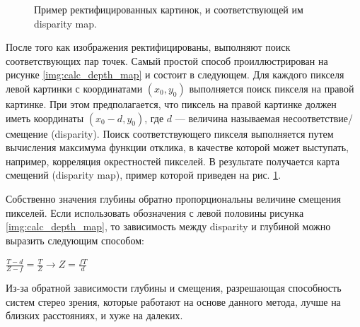 \begin{figure}[H]
\begin{minipage}[h]{0.3\linewidth}
	\end{minipage}
	\caption{Пример ректифицированных картинок, и соответствующей им disparity map.}
	\label{depth_example1}
\end{figure}

После того как изображения ректифицированы, выполняют поиск соответствующих пар точек. Самый простой способ проиллюстрирован на рисунке \ref{img:calc_depth_map} и состоит в следующем. Для каждого пикселя левой картинки с координатами $(x_0, y_0)$ выполняется поиск пикселя на правой картинке. При этом предполагается, что пиксель на правой картинке должен иметь координаты $(x_0 - d, y_0)$, где $d$ — величина называемая несоответствие/смещение (disparity). Поиск соответствующего пикселя выполняется путем вычисления максимума функции отклика, в качестве которой может выступать, например, корреляция окрестностей пикселей. В результате получается карта смещений (disparity map), пример которой приведен на рис. \ref{depth_example1}.


Собственно значения глубины обратно пропорциональны величине смещения пикселей. Если использовать обозначения с левой половины рисунка \ref{img:calc_depth_map}, то зависимость между disparity и глубиной можно выразить следующим способом:

$\displaystyle \frac{T-d}{Z-f}=\frac{T}{Z} \rightarrow Z=\frac{fT}{d}$

Из-за обратной зависимости глубины и смещения, разрешающая способность систем стерео зрения, которые работают на основе данного метода, лучше на близких расстояниях, и хуже на далеких.